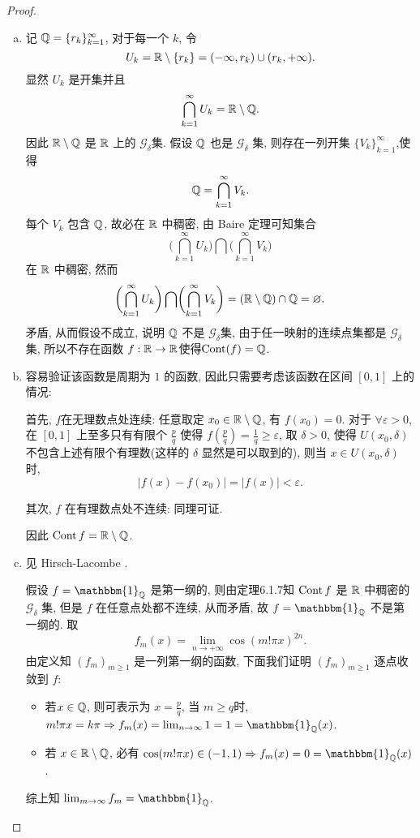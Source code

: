 \begin{proof}
  \begin{enumerate}[(a)]
    \item 记 $\mathbb{Q}=\{r_k\}_{k=1}^{\infty}$, 对于每一个 $k$, 令
      \[U_k=\mathbb{R}\setminus\{r_k\}=(-\infty,r_k)\cup(r_k,+\infty).\]
      显然 $U_k$ 是开集并且
      \[\bigcap_{k=1}^{\infty}U_k=\mathbb{R}\setminus\mathbb{Q}.\]
      因此 $\mathbb{R}\setminus\mathbb{Q}$ 是 $\mathbb{R}$ 上的 $\mathcal{G}_{\delta}$集.
      假设 $\mathbb{Q}$ 也是 $\mathcal{G}_{\delta}$ 集, 则存在一列开集 $\{V_k\}_{k=1}^{\infty}$,使得
      \[\mathbb{Q}=\bigcap_{k=1}^{\infty}V_k.\]
      每个 $V_k$ 包含 $\mathbb{Q}$, 故必在 $\mathbb{R}$ 中稠密, 由 Baire 定理可知集合
      \[\biggl(\bigcap_{k=1}^{\infty}U_k\biggr)\bigcap\biggl(\bigcap_{k=1}^{\infty}V_k\biggr)\]
      在 $\mathbb{R}$ 中稠密, 然而
      \[\biggl(\bigcap_{k=1}^{\infty}U_k\biggr)\bigcap\biggl(\bigcap_{k=1}^{\infty}V_k\biggr)=(\mathbb{R}\setminus\mathbb{Q})\cap\mathbb{Q}=\varnothing.\]
      矛盾, 从而假设不成立, 说明 $\mathbb{Q}$ 不是 $\mathcal{G}_{\delta}$集,
      由于任一映射的连续点集都是 $\mathcal{G}_{\delta}$ 集,
      所以不存在函数 $f:\mathbb{R}\to\mathbb{R}$使得$\textrm{Cont}(f)=\mathbb{Q}$.

    \item 容易验证该函数是周期为 $1$ 的函数, 因此只需要考虑该函数在区间 $[0,1]$ 上的情况:
   
      首先, $f$在无理数点处连续: 任意取定 $x_0\in\mathbb{R}\setminus\mathbb{Q}$,
      有 $f(x_0)=0$. 对于 $\forall\varepsilon>0$, 在 $[0,1]$ 上至多只有有限个 $\frac{p}{q}$
      使得 $f(\frac{p}{q})=\frac{1}{q}\geq\varepsilon$, 取 $\delta>0$, 
      使得 $U(x_0,\delta)$ 不包含上述有限个有理数(这样的 $\delta$ 显然是可以取到的), 则当 $x\in U(x_0,\delta)$ 时,
      \[|f(x)-f(x_0)|=|f(x)|<\varepsilon.\]

      其次, $f$ 在有理数点处不连续: 同理可证.

      因此 $\operatorname{Cont}{f}=\mathbb{R}\setminus\mathbb{Q}$.

    \item 见 Hirsch-Lacombe \cite[Page 65]{hirsch2012elements}.

      假设 $f=\mathbbm{1}_{\FQ}$ 是第一纲的, 则由定理6.1.7知 $\operatorname{Cont}{f}$ 是
      $\mathbb{R}$ 中稠密的 $\mathcal{G}_{\delta}$ 集, 但是 $f$ 在任意点处都不连续, 
      从而矛盾, 故 $f=\mathbbm{1}_{\FQ}$ 不是第一纲的. 取
      \[f_m(x)=\lim_{n\to+\infty}\cos(m!\pi x)^{2n}.\]
      由定义知 $(f_m)_{m\geq 1}$ 是一列第一纲的函数, 下面我们证明 $(f_m)_{m\geq 1}$ 逐点收敛到 $f$:
      \begin{itemize}
      \item 若$x\in\mathbb{Q}$, 则可表示为 $x=\frac{p}{q}$, 当 $m\geq q$时,
            $m!\pi x=k\pi\Rightarrow f_m(x)=\lim_{n\to\infty}1=1=\mathbbm{1}_{\FQ}(x)$.
      \item 若 $x\in\mathbb{R}\setminus\mathbb{Q}$, 必有 $\cos(m!\pi x)\in(-1,1)\Rightarrow f_m(x)=0=\mathbbm{1}_{\FQ}(x)$.
      \end{itemize}
      综上知 $\lim_{m\to\infty}f_m=\mathbbm{1}_{\FQ}$. \qedhere
    \end{enumerate}
\end{proof}



